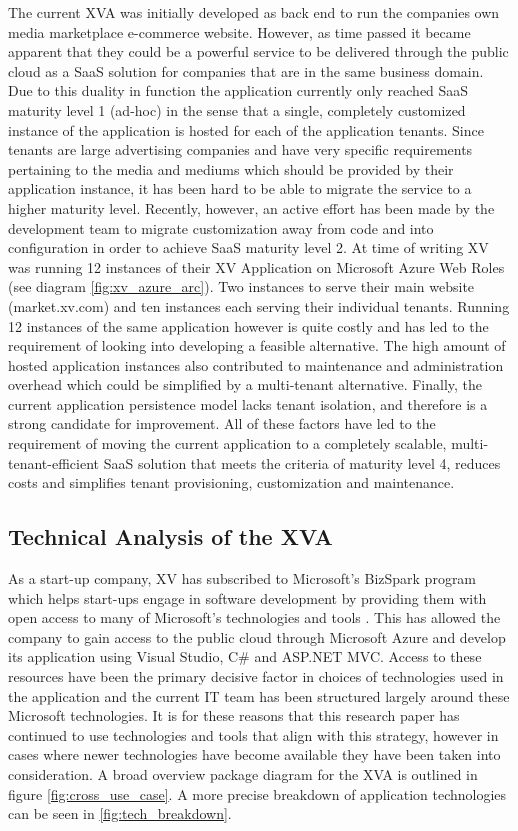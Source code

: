 The current XVA was initially developed as back end to run the companies own media marketplace e-commerce website. However, as time passed it became apparent that they could be a powerful service to be delivered through the public cloud as a SaaS solution for companies that are in the same business domain. Due to this duality in function the application currently only reached SaaS maturity  level 1 (ad-hoc) \cite{Chong2006} in the sense that a single, completely customized instance of the application is hosted for each of the application tenants. Since tenants are large advertising companies and have very specific requirements pertaining to the media and mediums which should be provided by their application instance, it has been hard to be able to migrate the service to a higher maturity level. Recently, however, an active effort has been made by the development team to migrate customization away from code and into configuration in order to achieve SaaS maturity level 2.
At time of writing XV was running 12 instances of their XV Application on Microsoft Azure Web Roles (see diagram \ref{fig:xv_azure_arc}). Two instances to serve their main website (market.xv.com) and ten instances each serving their individual tenants. Running 12 instances of the same application however is quite costly and has led to the requirement of looking into developing a feasible alternative. The high amount of hosted application instances also contributed to maintenance and administration overhead which could be simplified by a multi-tenant alternative. Finally, the current application persistence model lacks tenant isolation, and therefore is a strong candidate for improvement. All of these factors have led to the requirement of moving the current application to a completely scalable, multi-tenant-efficient SaaS solution that meets the criteria of maturity level 4, reduces costs and simplifies tenant provisioning, customization and maintenance.

\subsection{Technical Analysis of the XVA}
\label{sec:techconst}
As a start-up company, XV has subscribed to Microsoft's BizSpark program which helps start-ups engage in software development by providing them with open access to many of Microsoft's technologies and tools \cite{BizSpark}. This has allowed the company to gain access to the public cloud through Microsoft Azure and develop its application using Visual Studio, C\# and ASP.NET MVC. Access to these resources have been the primary decisive factor in choices of technologies used in the application and the current IT team has been structured largely around these Microsoft technologies. It is for these reasons that this research paper has continued to use technologies and tools that align with this strategy, however in cases where newer technologies have become available they have been taken into consideration. A broad overview package diagram for the XVA is outlined in figure \ref{fig:cross_use_case}. A more precise breakdown of application technologies can be seen in \ref{fig:tech_breakdown}.

